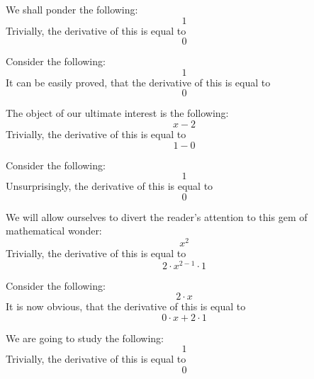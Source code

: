 \documentclass{article}
\begin{document}
We shall ponder the following:
\begin{equation}
1 
\end{equation}
Trivially, the derivative of this is equal to
\begin{equation}
0 
\end{equation}

Consider the following:
\begin{equation}
1 
\end{equation}
It can be easily proved, that the derivative of this is equal to
\begin{equation}
0 
\end{equation}

The object of our ultimate interest is the following:
\begin{equation}
x - 2 
\end{equation}
Trivially, the derivative of this is equal to
\begin{equation}
1 - 0 
\end{equation}

Consider the following:
\begin{equation}
1 
\end{equation}
Unsurprisingly, the derivative of this is equal to
\begin{equation}
0 
\end{equation}

We will allow ourselves to divert the reader's attention to this gem of mathematical wonder:
\begin{equation}
x ^{2 } 
\end{equation}
Trivially, the derivative of this is equal to
\begin{equation}
2 \cdot x ^{2 - 1 } \cdot 1 
\end{equation}

Consider the following:
\begin{equation}
2 \cdot x 
\end{equation}
It is now obvious, that the derivative of this is equal to
\begin{equation}
0 \cdot x + 2 \cdot 1 
\end{equation}

We are going to study the following:
\begin{equation}
1 
\end{equation}
Trivially, the derivative of this is equal to
\begin{equation}
0 
\end{equation}
\end{document}
